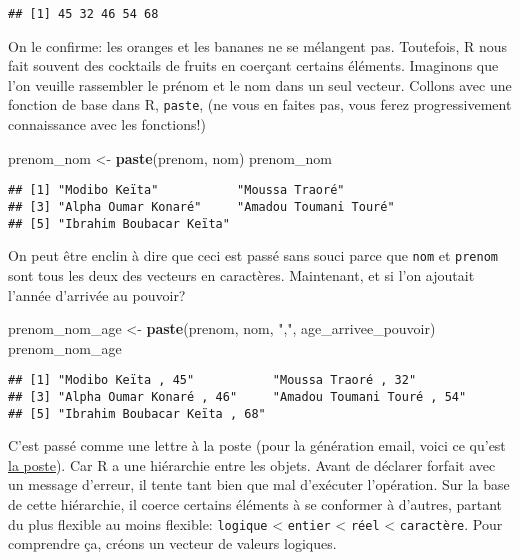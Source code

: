\documentclass[]{book}
\newenvironment{Shaded}{\begin{snugshade}}{\end{snugshade}}
\newcommand{\KeywordTok}[1]{\textcolor[rgb]{0.13,0.29,0.53}{\textbf{#1}}}
\newcommand{\StringTok}[1]{\textcolor[rgb]{0.31,0.60,0.02}{#1}}
\newcommand{\NormalTok}[1]{#1}
\begin{document}
\begin{verbatim}
## [1] 45 32 46 54 68
\end{verbatim}

On le confirme: les oranges et les bananes ne se mélangent pas.
Toutefois, R nous fait souvent des cocktails de fruits en coerçant
certains éléments. Imaginons que l'on veuille rassembler le prénom et le
nom dans un seul vecteur. Collons avec une fonction de base dans R,
\texttt{paste}, (ne vous en faites pas, vous ferez progressivement
connaissance avec les fonctions!)

\begin{Shaded}
\begin{Highlighting}[]
\NormalTok{prenom_nom <-}\StringTok{ }\KeywordTok{paste}\NormalTok{(prenom, nom)}
\NormalTok{prenom_nom}
\end{Highlighting}
\end{Shaded}

\begin{verbatim}
## [1] "Modibo Keïta"           "Moussa Traoré"         
## [3] "Alpha Oumar Konaré"     "Amadou Toumani Touré"  
## [5] "Ibrahim Boubacar Keïta"
\end{verbatim}

On peut être enclin à dire que ceci est passé sans souci parce que
\texttt{nom} et \texttt{prenom} sont tous les deux des vecteurs en
caractères. Maintenant, et si l'on ajoutait l'année d'arrivée au
pouvoir?

\begin{Shaded}
\begin{Highlighting}[]
\NormalTok{prenom_nom_age <-}\StringTok{ }\KeywordTok{paste}\NormalTok{(prenom, nom, }\StringTok{","}\NormalTok{, age_arrivee_pouvoir)}
\NormalTok{prenom_nom_age}
\end{Highlighting}
\end{Shaded}

\begin{verbatim}
## [1] "Modibo Keïta , 45"           "Moussa Traoré , 32"         
## [3] "Alpha Oumar Konaré , 46"     "Amadou Toumani Touré , 54"  
## [5] "Ibrahim Boubacar Keïta , 68"
\end{verbatim}

C'est passé comme une lettre à la poste (pour la génération email, voici
ce qu'est \href{https://fr.wikipedia.org/wiki/Poste}{la poste}). Car R a
une hiérarchie entre les objets. Avant de déclarer forfait avec un
message d'erreur, il tente tant bien que mal d'exécuter l'opération. Sur
la base de cette hiérarchie, il coerce certains éléments à se conformer
à d'autres, partant du plus flexible au moins flexible: \texttt{logique}
\textless{} \texttt{entier} \textless{} \texttt{réel} \textless{}
\texttt{caractère}. Pour comprendre ça, créons un vecteur de valeurs
logiques.
\end{document}
